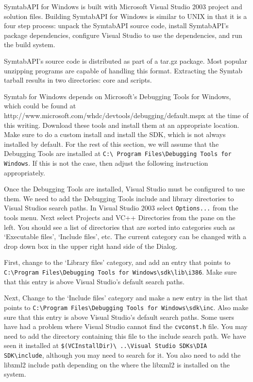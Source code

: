 SymtabAPI for Windows is built with Microsoft Visual Studio 2003 project and
solution files.   Building SymtabAPI for Windows is similar to UNIX in that it
is a four step process: unpack the SymtabAPI source code, install SymtabAPI's
package dependencies, configure Visual Studio to use the dependencies, and run
the build system. 

SymtabAPI's source code is distributed as part of a tar.gz package. Most popular
unzipping programs are capable of handling this format. Extracting the Symtab
tarball results in two directories: core and scripts. 

Symtab for Windows depends on Microsoft's Debugging Tools for Windows, which
could be found at http://www.microsoft.com/whdc/devtools/debugging/default.mspx
at the time of this writing. Download these tools and install them at an
appropriate location. Make sure to do a custom install and install the SDK,
which is not always installed by default. For the rest of this section, we will
assume that the Debugging Tools are installed at \texttt{C:\textbackslash
    Program Files\textbackslash Debugging
Tools for Windows}. If this is not the case, then adjust the following
instruction appropriately.

Once the Debugging Tools are installed, Visual Studio must be configured to use
them. We need to add the Debugging Tools include and library directories to
Visual Studios search paths. In Visual Studio 2003 select \texttt{Options...} from the
tools menu. Next select Projects and VC++ Directories from the pane on the left.
You should see a list of directories that are sorted into categories such as
`Executable files', `Include files', etc. The current category can
be changed with a drop down box in the upper right hand side of the Dialog. 

First, change to the `Library files' category, and add an entry that
points to \\
\texttt{C:\textbackslash Program Files\textbackslash Debugging Tools
for Windows\textbackslash sdk\textbackslash lib\textbackslash i386}. Make sure
that this entry is above Visual Studio's default search paths.

Next, Change to the `Include files' category and make a new entry in the
list that points to \texttt{C:\textbackslash Program Files\textbackslash Debugging Tools for
Windows\textbackslash sdk\textbackslash inc}. Also
make sure that this entry is above Visual Studio's default search paths. Some
users have had a problem where Visual Studio cannot find the \texttt{cvconst.h} file. You
may need to add the directory containing this file to the include search path.
We have seen it installed at \texttt{\$(VCInstallDir)\textbackslash
    ..\textbackslash Visual Studio SDKs\textbackslash DIA
SDK\textbackslash include}, although you may need to search for it. You also need to add the
libxml2 include path depending on the where the libxml2 is installed on the
system.  

